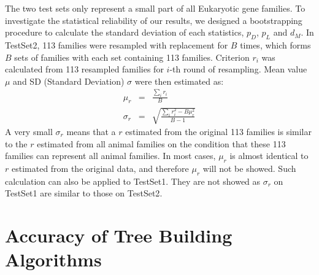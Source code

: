 The two test sets only represent a small part of all Eukaryotic gene families.
To investigate the statistical reliability of our results, we designed a bootstrapping
procedure to calculate the standard deviation of each statistics, $p_D$, $p_L$ and $d_M$.
In {\sf TestSet2},
113 families were resampled with replacement for $B$ times, which forms $B$ sets of families
with each set containing 113 families.
Criterion $r_i$ was calculated from 113 resampled families for $i$-th round of resampling.
Mean value $\mu$ and SD (Standard Deviation) $\sigma$ were then estimated as:
\begin{eqnarray*}
\mu_r&=&\frac{\sum_i r_i}{B}\\
\sigma_r&=&\sqrt{\frac{\sum_i{r^2_i}-B\mu_r^2}{B-1}}
\end{eqnarray*}
A very small $\sigma_r$ means that a $r$ estimated from the original 113 families is similar to
the $r$ estimated from all animal families on the condition that these 113 families can represent all animal families.
In most cases, $\mu_r$ is almost identical to $r$ estimated from the original data, and
therefore $\mu_r$ will not be showed. Such calculation can also be applied to
{\sf TestSet1}. They are not showed as $\sigma_r$ on {\sf TestSet1} are similar to those
on {\sf TestSet2}.

\section{Accuracy of Tree Building Algorithms}

